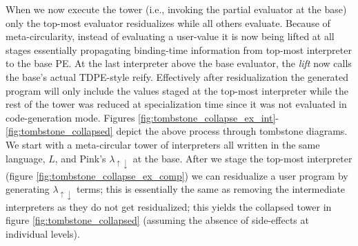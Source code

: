 \documentclass[a4paper,12pt,twoside,openright]{report}
\theoremstyle{definition}
\newcommand{\mslang}{$\lambda_{\uparrow\downarrow}$}
\begin{document}
When we now execute the tower (i.e., invoking the partial evaluator at the base) only the top-most evaluator residualizes while all others evaluate. Because of meta-circularity, instead of evaluating a user-value it is now being lifted at all stages essentially propagating binding-time information from top-most interpreter to the base PE. At the last interpreter above the base evaluator, the \textit{lift} now calls the base's actual TDPE-style reify. Effectively after residualization the generated program will only include the values staged at the top-most interpreter while the rest of the tower was reduced at specialization time since it was not evaluated in code-generation mode. Figures \ref{fig:tombstone_collapse_ex_int}-\ref{fig:tombstone_collapsed} depict the above process through tombstone diagrams. We start with a meta-circular tower of interpreters all written in the same language, $L$, and Pink's \mslang{} at the base. After we stage the top-most interpreter (figure \ref{fig:tombstone_collapse_ex_comp}) we can residualize a user program by generating \mslang{} terms; this is essentially the same as removing the intermediate interpreters as they do not get residualized; this yields the collapsed tower in figure \ref{fig:tombstone_collapsed} (assuming the absence of side-effects at individual levels).
\end{document}
